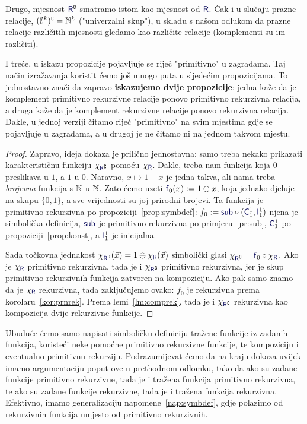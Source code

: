 Drugo, mjesnost  $\f R\kompl$ smatramo istom kao mjesnost od $\f R$. Čak i u slučaju prazne relacije, $(\emptyset^k)\sp{{\scriptscriptstyle\complement}}={\mathbb N}^k$ ("univerzalni skup"), u skladu s našom odlukom da prazne relacije različitih mjesnosti gledamo kao različite relacije (komplementi su im različiti).

I treće, u iskazu propozicije pojavljuje se riječ "primitivno" u zagradama. Taj način izražavanja koristit ćemo još mnogo puta u sljedećim propozicijama. To jednostavno znači da zapravo \textbf{iskazujemo dvije propozicije}: jedna kaže da je komplement primitivno rekurzivne relacije ponovo primitivno rekurzivna relacija, a druga kaže da je komplement rekurzivne relacije ponovo rekurzivna relacija. Dakle, u jednoj verziji čitamo riječ "primitivno" na svim mjestima gdje se pojavljuje u zagradama, a u drugoj je ne čitamo ni na jednom takvom mjestu.

\begin{proof}
Zapravo, ideja dokaza je prilično jednostavna: samo treba nekako prikazati karakterističnu funkciju $\chi_{\f R\kompl}$ pomoću $\chi_{\f R}$. Dakle, treba nam funkcija koja $0$ preslikava u $1$, a $1$ u $0$. Naravno, $x\mapsto1-x$ je jedna takva, ali nama treba \emph{brojevna} funkcija s ${\mathbb N}$ u ${\mathbb N}$. Zato ćemo uzeti $\f f_0(x):=1\ominus x$, koja jednako djeluje na skupu $\{0,1\}$, a sve vrijednosti su joj prirodni brojevi. Ta funkcija je primitivno rekurzivna po propoziciji~\ref{prop:symbdef}: $f_0:=\f{sub}\circ(\f C_1^1,\f I_1^1)$ njena je simbolička definicija, $\f{sub}$ je primitivno rekurzivna po primjeru~\ref{pr:sub}, $\f C_1^1$ po propoziciji~\ref{prop:konst}, a $\f I_1^1$ je inicijalna.

Sada točkovna jednakost $\chi_{\f R\kompl}(\vec x)=1\ominus\chi_{\f R}(\vec x)$ simbolički glasi $\chi_{\f R\kompl}=\f f_0\circ\chi_{\f R}$. Ako je $\chi_{\f R}$ primitivno rekurzivna, tada je i $\chi_{\f R\kompl}$ primitivno rekurzivna, jer je skup primitivno rekurzivnih funkcija zatvoren na kompoziciju.
Ako pak samo znamo da je $\chi_{\f R}$ rekurzivna, tada zaključujemo ovako: $f_0$ je rekurzivna prema korolaru~\ref{kor:prnrek}. Prema lemi~\ref{lm:comprek}, tada je i $\chi_{\f R\kompl}$ rekurzivna kao kompozicija dvije rekurzivne funkcije.
\end{proof}

Ubuduće ćemo samo napisati simboličku definiciju tražene funkcije iz zadanih funkcija, koristeći neke pomoćne primitivno rekurzivne funkcije, te kompoziciju i eventualno primitivnu rekurziju. Podrazumijevat ćemo da na kraju dokaza uvijek imamo argumentaciju poput ove u prethodnom odlomku, tako da ako su zadane funkcije primitivno rekurzivne, tada je i tražena funkcija primitivno rekurzivna, te ako su zadane funkcije rekurzivne, tada je i tražena funkcija rekurzivna. Efektivno, imamo generalizaciju napomene~\ref{nap:symbdef}, gdje polazimo od rekurzivnih funkcija umjesto od primitivno rekurzivnih.

